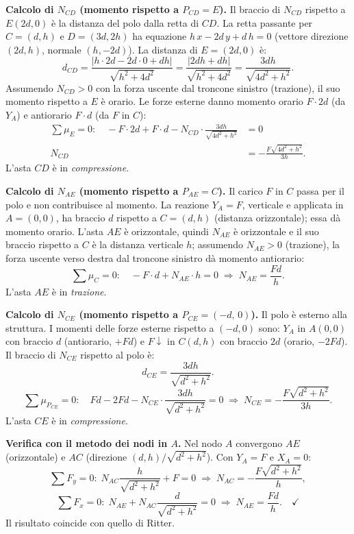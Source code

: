 \begin{esempio}
\begin{svolgimento}
		\noindent\textbf{Calcolo di $N_{CD}$
			(momento rispetto a $P_{CD} = E$).}
		Il braccio di $N_{CD}$ rispetto a $E(2d,0)$
		è la distanza del polo dalla retta di $CD$.
		La retta passante per $C=(d,h)$ e $D=(3d,2h)$
		ha equazione $h\,x - 2d\,y + d\,h = 0$
		(vettore direzione $(2d,h)$, normale $(h,-2d)$).
		La distanza di $E=(2d,0)$ è:
		\[
		d_{CD}
		= \frac{|h\cdot 2d - 2d\cdot 0 + dh|}{\sqrt{h^2+4d^2}}
		= \frac{|2dh+dh|}{\sqrt{h^2+4d^2}}
		= \frac{3dh}{\sqrt{4d^2+h^2}}.
		\]
		Assumendo $N_{CD} > 0$ con la forza uscente
		dal troncone sinistro (trazione), il suo momento
		rispetto a $E$ è orario. Le forze esterne
		danno momento orario $F \cdot 2d$ (da $Y_A$)
		e antiorario $F \cdot d$ (da $F$ in $C$):
		\begin{align*}
			\sum \mu_E = 0:\quad
			-F \cdot 2d + F \cdot d
			- N_{CD} \cdot \frac{3dh}{\sqrt{4d^2+h^2}}
			&= 0 \\
			N_{CD} &= -\frac{F\sqrt{4d^2+h^2}}{3h}.
		\end{align*}
		L'asta $CD$ è in \emph{compressione}.
		
		\noindent\textbf{Calcolo di $N_{AE}$
			(momento rispetto a $P_{AE} = C$).}
		Il carico $F$ in $C$ passa per il polo e non
		contribuisce al momento. La reazione $Y_A = F$,
		verticale e applicata in $A=(0,0)$, ha braccio $d$
		rispetto a $C=(d,h)$ (distanza orizzontale);
		essa dà momento orario. L'asta $AE$ è orizzontale,
		quindi $N_{AE}$ è orizzontale e il suo braccio
		rispetto a $C$ è la distanza verticale $h$;
		assumendo $N_{AE}>0$ (trazione), la forza uscente
		verso destra dal troncone sinistro dà momento
		antiorario:
		\[
		\sum \mu_C = 0:\quad
		-F \cdot d + N_{AE} \cdot h = 0
		\;\Rightarrow\;
		N_{AE} = \frac{Fd}{h}.
		\]
		L'asta $AE$ è in \emph{trazione}.
		
		\noindent\textbf{Calcolo di $N_{CE}$
			(momento rispetto a $P_{CE} = (-d,\,0)$).}
		Il polo è esterno alla struttura. I momenti delle
		forze esterne rispetto a $(-d,0)$ sono: $Y_A$ in
		$A(0,0)$ con braccio $d$ (antiorario, $+Fd$) e
		$F\downarrow$ in $C(d,h)$ con braccio $2d$
		(orario, $-2Fd$). Il braccio di $N_{CE}$ rispetto
		al polo è:
		\[
		d_{CE} = \frac{3dh}{\sqrt{d^2+h^2}}.
		\]
		\[
		\sum \mu_{P_{CE}} = 0:\quad
		Fd - 2Fd
		- N_{CE} \cdot \frac{3dh}{\sqrt{d^2+h^2}}
		= 0
		\;\Rightarrow\;
		N_{CE} = -\frac{F\sqrt{d^2+h^2}}{3h}.
		\]
		L'asta $CE$ è in \emph{compressione}.
		
		\noindent\textbf{Verifica con il metodo dei nodi
			in $A$.}
		Nel nodo $A$ convergono $AE$ (orizzontale) e $AC$
		(direzione $(d,h)/\sqrt{d^2+h^2}$). Con $Y_A=F$
		e $X_A=0$:
		\[
		\sum F_y = 0:\;
		N_{AC}\frac{h}{\sqrt{d^2+h^2}} + F = 0
		\;\Rightarrow\;
		N_{AC} = -\frac{F\sqrt{d^2+h^2}}{h},
		\]
		\[
		\sum F_x = 0:\;
		N_{AE} + N_{AC}\frac{d}{\sqrt{d^2+h^2}} = 0
		\;\Rightarrow\;
		N_{AE} = \frac{Fd}{h}. \quad\checkmark
		\]
		Il risultato coincide con quello di Ritter.
		

\end{svolgimento}
\end{esempio}
